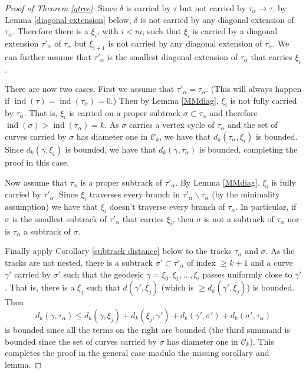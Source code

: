 \documentclass[11pt]{article}
\theoremstyle{remark}
\def\C{{\mathcal C}}
\def\ind{\operatorname{ind}}
\begin{document}
\begin{proof}[Proof of Theorem \ref{qtree}]
Since $\delta$ is
carried by $\tau$ but not carried by $\tau_\alpha\to \tau$, by Lemma \ref{diagonal extension} below, $\delta$ is 
not carried by any diagonal extension of $\tau_\alpha$. 
Therefore there is a $\xi_i$, with $i<
m$, such that $\xi_i$ is carried by a diagonal extension
$\tau'_\alpha$ of $\tau_\alpha$ but $\xi_{i+1}$ is not carried by any
diagonal extension of $\tau_\alpha$. We can further assume that $\tau'_\alpha$ is the smallest diagonal extension of $\tau_\alpha$ that carries $\xi_i$.

There are now two cases. First we assume that $\tau'_\alpha = \tau_\alpha$. (This will always happen if $\ind(\tau) =\ind(\tau_\alpha) = 0$.) Then by Lemma \ref{MMdiag}, $\xi_i$ is not fully carried by $\tau_\alpha$. That is, $\xi_i$ is carried on a proper subtrack $\sigma \subset \tau_\alpha$ and therefore $\ind(\sigma) > \ind(\tau_\alpha)=k$. As $\sigma$ carries a vertex cycle of $\tau_\alpha$ and the set of curves carried by $\sigma$ has diameter one in $\C_k$, we have that $d_k(\tau_\alpha, \xi_i)$ is bounded. Since $d_k(\gamma, \xi_i)$ is bounded, we have that $d_k(\gamma, \tau_\alpha)$ is bounded, completing the proof in this case.

Now assume that $\tau_\alpha$ is a proper subtrack of $\tau'_\alpha$.
By Lemma \ref{MMdiag}, $\xi_i$ is fully carried by $\tau'_\alpha$. Since $\xi_i$ traverses every branch in $\tau'_\alpha \smallsetminus \tau_\alpha$ (by the minimality assumption) we have that $\xi_i$ doesn't traverse every branch of $\tau_\alpha$. In particular, if $\sigma$ is the smallest subtrack of $\tau'_\alpha$ that carries $\xi_i$, then $\sigma$ is not a subtrack of $\tau_\alpha$ nor is $\tau_\alpha$ a subtrack of $\sigma$.

Finally apply Corollary \ref{subtrack
  distance} below to the tracks $\tau_\alpha$ and $\sigma$. As the tracks are not nested, there is a
subtrack $\sigma' \subset \tau'_\alpha$ of index $ \ge k+1$ and a curve
$\gamma'$ carried by $\sigma'$ such that the geodesic $\gamma=\xi_0,
\xi_1, \dots, \xi_i$ passes uniformly close to $\gamma'$. That is,
there is a $\xi_j$ such that $d(\gamma',\xi_j)$ (which is $\ge d_k(\gamma',
\xi_j)$) is bounded. 
Then
$$d_k(\gamma, \tau_\alpha) \le d_k(\gamma, \xi_j) + d_k(\xi_j, \gamma') + d_k(\gamma', \sigma') + d_k(\sigma', \tau_\alpha)$$
is bounded since all the terms on the right are bounded (the third
summand is bounded since the set of curves carried by $\sigma$ has diameter one in $\C_k$). This completes the proof in the general case modulo the missing corollary and lemma.
\end{proof}
\end{document}
